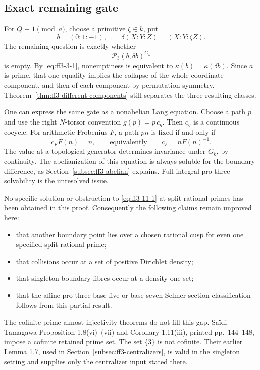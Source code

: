 


\subsection{Exact remaining gate}
\label{subsec:ff3-gate}

For \(Q\equiv1\pmod a\), choose a primitive \(\zeta\in k\), put \[
 b=(0:1:-1),\qquad
 \delta(X:Y:Z)=(X:Y:\zeta Z).
\] The remaining question is exactly whether \begin{equation}
\mathcal P_3(b,\delta b)^{G_k}
\label{eq:ff3-11-1}
\end{equation} is empty. By \eqref{eq:ff3-3-1}, nonemptiness is equivalent to \(\kappa(b)=\kappa(\delta b)\). Since \(a\) is prime, that one equality implies the collapse of the whole coordinate component, and then of each component by permutation symmetry. Theorem~\ref{thm:ff3-different-components} still separates the three resulting classes.

One can express the same gate as a nonabelian Lang equation. Choose a path \(p\) and use the right \(N\)-torsor convention \(g(p)=p\,c_g\). Then \(c_g\) is a continuous cocycle. For arithmetic Frobenius \(F\), a path \(pn\) is fixed if and only if \begin{equation}
c_F F(n)=n,\qquad\text{equivalently}\qquad
 c_F=nF(n)^{-1}.
\label{eq:ff3-11-2}
\end{equation} The value at a topological generator determines invariance under \(G_k\), by continuity. The abelianization of this equation is always soluble for the boundary difference, as Section~\ref{subsec:ff3-abelian} explains. Full integral pro-three solvability is the unresolved issue.

No specific solution or obstruction to \eqref{eq:ff3-11-1} at split rational primes has been obtained in this proof. Consequently the following claims remain unproved here:

\begin{itemize}
\item
  that another boundary point lies over a chosen rational cusp for even one specified split rational prime;
\item
  that collisions occur at a set of positive Dirichlet density;
\item
  that singleton boundary fibres occur at a density-one set;
\item
  that the affine pro-three base-five or base-seven Selmer section classification follows from this partial result.
\end{itemize}

The cofinite-prime almost-injectivity theorems do not fill this gap. Saïdi--Tamagawa Proposition 1.8(vi)--(vii) and Corollary 1.11(iii), printed pp.~144--148, impose a cofinite retained prime set. The set \(\{3\}\) is not cofinite. Their earlier Lemma 1.7, used in Section~\ref{subsec:ff3-centralizers}, is valid in the singleton setting and supplies only the centralizer input stated there.
